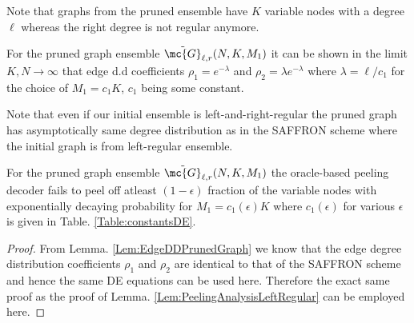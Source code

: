 \documentclass[conference,,twocolumn]{IEEEtran}
\begin{document}
Note that graphs from the pruned ensemble have $K$ variable nodes with a degree $\ell$ whereas the right degree is not regular anymore. 

\begin{lemma}
\label{Lem:EdgeDDPrunedGraph}
For the pruned graph ensemble $\tilde{\mc{G}}_{\ell,r}(N,K,M_1)$ it can be shown in the limit $K,N\rightarrow\infty$ that edge d.d coefficients $\rho_{1}=e^{-\lambda}$ and $\rho_{2}=\lambda e^{-\lambda}$ where $\lambda=\ell/c_1$ for the choice of $M_1=c_1K$, $c_1$ being some constant.
\end{lemma}

Note that even if our initial ensemble is left-and-right-regular the pruned graph has asymptotically same degree distribution as in the SAFFRON scheme where the initial graph is from left-regular ensemble.

\begin{lemma}
\label{Lem:PeelingRegularAnalysis}
For the pruned graph ensemble $\tilde{\mc{G}}_{\ell,r}(N, K,M_1)$ the oracle-based peeling decoder fails to peel off atleast $(1-\epsilon)$ fraction of the variable nodes with exponentially decaying probability for $M_1=c_1(\epsilon)K$ where $c_1(\epsilon)$ for various $\epsilon$ is given in Table. \ref{Table:constantsDE}.
\end{lemma}


\begin{proof}
From Lemma. \ref{Lem:EdgeDDPrunedGraph} we know that the edge degree distribution coefficients $\rho_1$ and $\rho_2$ are identical to that of the SAFFRON scheme and hence the same DE equations can be used here. Therefore the exact same proof as the proof of Lemma. \ref{Lem:PeelingAnalysisLeftRegular} can be employed here.
\end{proof}
\end{document}
